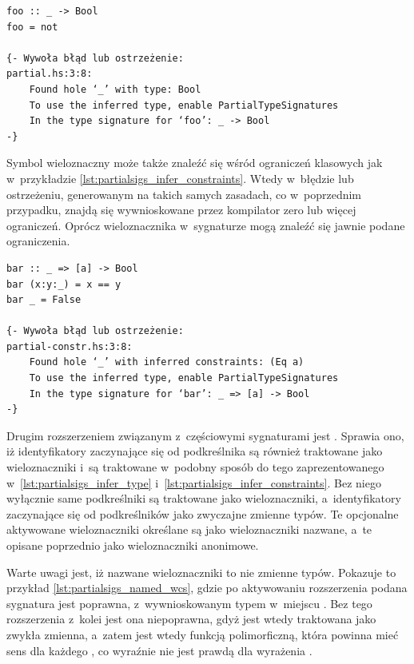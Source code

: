 \begin{lstlisting}[float,label={lst:partialsigs_infer_type},
                   caption={Przykład użycia anonimowego symbolu wieloznacznego w sygnaturze typu.}]
foo :: _ -> Bool
foo = not

{- Wywoła błąd lub ostrzeżenie:
partial.hs:3:8:
    Found hole ‘_’ with type: Bool
    To use the inferred type, enable PartialTypeSignatures
    In the type signature for ‘foo’: _ -> Bool
-}
\end{lstlisting}

Symbol wieloznaczny może także znaleźć się wśród ograniczeń klasowych jak
w~przykładzie \ref{lst:partialsigs_infer_constraints}. Wtedy w~błędzie lub
ostrzeżeniu, generowanym na takich samych zasadach, co w~poprzednim przypadku,
znajdą się wywnioskowane przez kompilator zero lub więcej ograniczeń. Oprócz
wieloznacznika w~sygnaturze mogą znaleźć się jawnie podane ograniczenia.

\begin{lstlisting}[float,label={lst:partialsigs_infer_constraints},
                   caption={Przykład użycia anonimowego symbolu wieloznacznego w ograniczeniach typu.}]
bar :: _ => [a] -> Bool
bar (x:y:_) = x == y
bar _ = False

{- Wywoła błąd lub ostrzeżenie:
partial-constr.hs:3:8:
    Found hole ‘_’ with inferred constraints: (Eq a)
    To use the inferred type, enable PartialTypeSignatures
    In the type signature for ‘bar’: _ => [a] -> Bool
-}
\end{lstlisting}

Drugim rozszerzeniem związanym z~częściowymi sygnaturami jest
. Sprawia ono, iż identyfikatory zaczynające się od
podkreślnika są również traktowane jako wieloznaczniki i~są traktowane w~podobny
sposób do tego zaprezentowanego w~\ref{lst:partialsigs_infer_type}
i~\ref{lst:partialsigs_infer_constraints}. Bez niego wyłącznie same podkreślniki
są traktowane jako wieloznaczniki, a~identyfikatory zaczynające się od
podkreślników jako zwyczajne zmienne typów. Te opcjonalne aktywowane wieloznaczniki
określane są jako wieloznaczniki nazwane, a~te opisane poprzednio jako
wieloznaczniki anonimowe.

Warte uwagi jest, iż nazwane wieloznaczniki to nie zmienne typów. Pokazuje to
przykład \ref{lst:partialsigs_named_wcs}, gdzie po aktywowaniu rozszerzenia
 podana sygnatura jest poprawna, z~wywnioskowanym typem
 w~miejscu . Bez tego rozszerzenia z~kolei jest
ona niepoprawna, gdyż  jest wtedy traktowana jako zwykła
zmienna, a~zatem  jest wtedy funkcją polimorficzną, która powinna mieć
sens dla każdego , co wyraźnie nie jest prawdą dla wyrażenia
\cite{GuidePartialTypeSignatures}.

